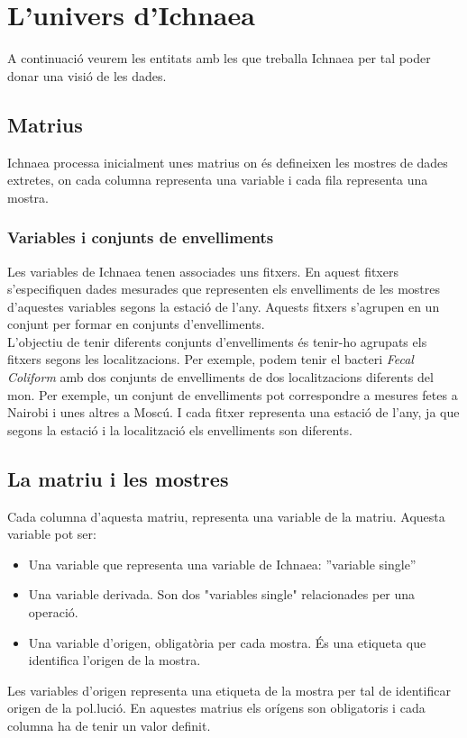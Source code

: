 \section{L'univers d'Ichnaea}
A continuaci\'{o} veurem les entitats amb les que treballa Ichnaea per tal poder donar una visi\'{o} de les dades.

\subsection{Matrius}
\label{cha:backgroud:univers:matrius}
Ichnaea processa inicialment unes matrius on \'e{s} defineixen les mostres de dades extretes, on cada columna representa una variable i cada fila representa una mostra. 

\subsubsection{Variables i conjunts de envelliments}
\label{cha:backgroud:univers:matrius:variables_seasons}
Les variables de Ichnaea tenen associades uns fitxers. En aquest fitxers s'especifiquen dades mesurades que representen els envelliments de les mostres d'aquestes variables segons la estació de l'any. Aquests fitxers s'agrupen en un conjunt per formar en conjunts d'envelliments.\\

L'objectiu de tenir diferents conjunts d'envelliments \'{e}s tenir-ho agrupats els fitxers segons les localitzacions. Per exemple, podem tenir el bacteri \textit{Fecal Coliform} amb dos conjunts de envelliments de dos localitzacions diferents del mon. Per exemple, un conjunt de envelliments pot correspondre a mesures fetes a Nairobi i unes altres a Mosc\'{u}. I cada fitxer representa una estaci\'{o} de l'any, ja que segons la estaci\'{o} i la localitzaci\'{o} els envelliments son diferents.\\

\subsection{La matriu i les mostres}
Cada columna d'aquesta matriu, representa una variable de la matriu. Aquesta variable pot ser:\\
\begin{itemize}
\item Una variable que representa una variable de Ichnaea: ''variable single''
\item Una variable derivada. Son dos "variables single" relacionades per una operaci\'{o}.
\item Una variable d'origen, obligatòria per cada mostra. \'{E}s una etiqueta que identifica l'origen de la mostra.
\end{itemize}
Les variables d'origen representa una etiqueta de la mostra per tal de identificar origen de la pol.luci\'{o}. En aquestes matrius els orígens son obligatoris i cada columna ha de tenir un valor definit.\\


